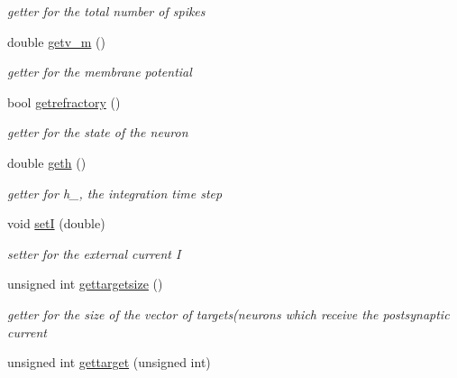 \begin{DoxyCompactItemize}
\begin{DoxyCompactList}\small\item\em getter for the total number of spikes \end{DoxyCompactList}\item 
\hypertarget{classNeuron_a4a10380b3515e38a1a4baae7b4ab66ce}{double \hyperlink{classNeuron_a4a10380b3515e38a1a4baae7b4ab66ce}{getv\-\_\-m} ()}\label{classNeuron_a4a10380b3515e38a1a4baae7b4ab66ce}

\begin{DoxyCompactList}\small\item\em getter for the membrane potential \end{DoxyCompactList}\item 
\hypertarget{classNeuron_a0c78342d2e5c09893292550980a50e4d}{bool \hyperlink{classNeuron_a0c78342d2e5c09893292550980a50e4d}{getrefractory} ()}\label{classNeuron_a0c78342d2e5c09893292550980a50e4d}

\begin{DoxyCompactList}\small\item\em getter for the state of the neuron \end{DoxyCompactList}\item 
\hypertarget{classNeuron_ae4efea91b87896853c213f25bf22f3e1}{double \hyperlink{classNeuron_ae4efea91b87896853c213f25bf22f3e1}{geth} ()}\label{classNeuron_ae4efea91b87896853c213f25bf22f3e1}

\begin{DoxyCompactList}\small\item\em getter for h\-\_\-, the integration time step \end{DoxyCompactList}\item 
\hypertarget{classNeuron_a85d5cfb84ab11f4c59c1d594666c5c8a}{void \hyperlink{classNeuron_a85d5cfb84ab11f4c59c1d594666c5c8a}{set\-I} (double)}\label{classNeuron_a85d5cfb84ab11f4c59c1d594666c5c8a}

\begin{DoxyCompactList}\small\item\em setter for the external current I \end{DoxyCompactList}\item 
\hypertarget{classNeuron_aeaa2c4eb2ea550cea614c444a8568783}{unsigned int \hyperlink{classNeuron_aeaa2c4eb2ea550cea614c444a8568783}{gettargetsize} ()}\label{classNeuron_aeaa2c4eb2ea550cea614c444a8568783}

\begin{DoxyCompactList}\small\item\em getter for the size of the vector of targets(neurons which receive the postsynaptic current \end{DoxyCompactList}\item 
\hypertarget{classNeuron_a682e1fe74dd9aa4e191a9fa94d812f86}{unsigned int \hyperlink{classNeuron_a682e1fe74dd9aa4e191a9fa94d812f86}{gettarget} (unsigned int)}\label{classNeuron_a682e1fe74dd9aa4e191a9fa94d812f86}


\end{DoxyCompactItemize}
